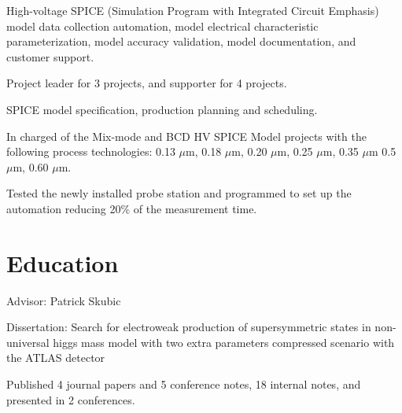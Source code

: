\documentclass[letterpaper]{deedy-resume-openfont}
\begin{document}
\begin{tightemize}
\item High-voltage SPICE (Simulation Program with Integrated Circuit Emphasis) model data collection automation, model electrical characteristic parameterization, model accuracy validation, model documentation, and customer support.
\item Project leader for 3 projects, and supporter for 4 projects.
\item SPICE model specification, production planning and scheduling.
\item In charged of the Mix-mode and BCD HV SPICE Model projects with the following process technologies: 0.13 $\mu$m, 0.18 $\mu$m, 0.20 $\mu$m, 0.25 $\mu$m, 0.35 $\mu$m 0.5 $\mu$m, 0.60 $\mu$m.
\item Tested the newly installed probe station and programmed to set up the automation reducing 20\% of the measurement time.
\end{tightemize}
\sectionsep





\section{Education} 

\begin{tightemize}
\item Advisor: Patrick Skubic
\item Dissertation: Search for electroweak production of supersymmetric states in non-universal higgs mass model with two extra parameters compressed scenario with the ATLAS detector\\
      \href{https://hdl.handle.net/11244/299774}{\color{link}{Dissertation link}}
\item Published 4 journal papers and 5 conference notes, 18 internal notes, and presented in 2 conferences.
\end{tightemize}
\sectionsep
\end{document}
